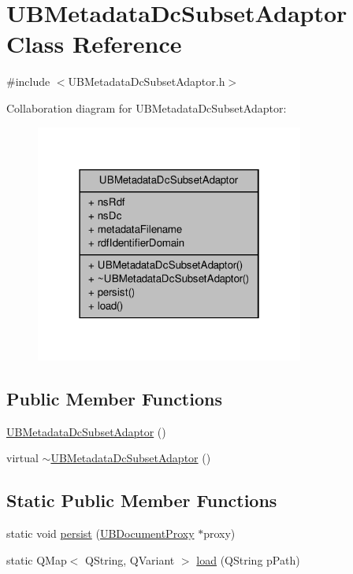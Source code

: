 \hypertarget{class_u_b_metadata_dc_subset_adaptor}{\section{U\-B\-Metadata\-Dc\-Subset\-Adaptor Class Reference}
\label{dc/d51/class_u_b_metadata_dc_subset_adaptor}
}


{\ttfamily \#include $<$U\-B\-Metadata\-Dc\-Subset\-Adaptor.\-h$>$}



Collaboration diagram for U\-B\-Metadata\-Dc\-Subset\-Adaptor\-:
\nopagebreak
\begin{figure}[H]
\begin{center}
\leavevmode
\includegraphics[width=250pt]{d2/da0/class_u_b_metadata_dc_subset_adaptor__coll__graph}
\end{center}
\end{figure}
\subsection*{Public Member Functions}
\begin{DoxyCompactItemize}
\item 
\hyperlink{class_u_b_metadata_dc_subset_adaptor_adced4f026b2059062bfa185b8eb19500}{U\-B\-Metadata\-Dc\-Subset\-Adaptor} ()
\item 
virtual \hyperlink{class_u_b_metadata_dc_subset_adaptor_a7856711e3cc24e64849099c9670fe77b}{$\sim$\-U\-B\-Metadata\-Dc\-Subset\-Adaptor} ()
\end{DoxyCompactItemize}
\subsection*{Static Public Member Functions}
\begin{DoxyCompactItemize}
\item 
static void \hyperlink{class_u_b_metadata_dc_subset_adaptor_a39cfa5435d5166fe515da61200777e45}{persist} (\hyperlink{class_u_b_document_proxy}{U\-B\-Document\-Proxy} $\ast$proxy)
\item 
static Q\-Map$<$ Q\-String, Q\-Variant $>$ \hyperlink{class_u_b_metadata_dc_subset_adaptor_a57db7afe0fcf73b2146e545c0c8360c3}{load} (Q\-String p\-Path)
\end{DoxyCompactItemize}
